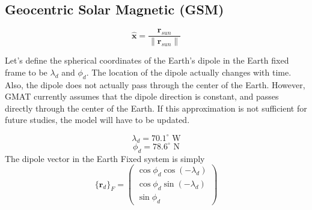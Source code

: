 {\subsection{ Geocentric Solar
Magnetic (GSM)}


\begin{equation}
     \hat{\mathbf{x}} = \frac{\mathbf{r}_{sun}}{\| \mathbf{r}_{sun} \|}
\end{equation}
%

Let's define the spherical coordinates of the Earth's dipole in
the Earth fixed frame to be $\lambda_d$ and $\phi_d$.  The
location of the dipole actually changes with time.  Also, the
dipole does not actually pass through the center of the Earth.
However, GMAT currently assumes that the dipole direction is
constant, and passes directly through the center of the Earth.  If
this approximation is not sufficient for future studies, the model
will have to be updated.

\begin{equation}
     \lambda_d = 70.1^{\circ}\mbox{  W}
\end{equation}
%
\begin{equation}
     \phi_d = 78.6 ^{\circ} \mbox{  N}
\end{equation}
%
The dipole vector in the Earth Fixed system is simply
%
\begin{equation}
    \{\mathbf{r}_d\}_F =   \begin{pmatrix}
               \cos{\phi_d}\cos{(-\lambda_d)}\\
                \cos{\phi_d}\sin{(-\lambda_d)}\\
                \sin{\phi_d}
     \end{pmatrix}
\end{equation}


}
